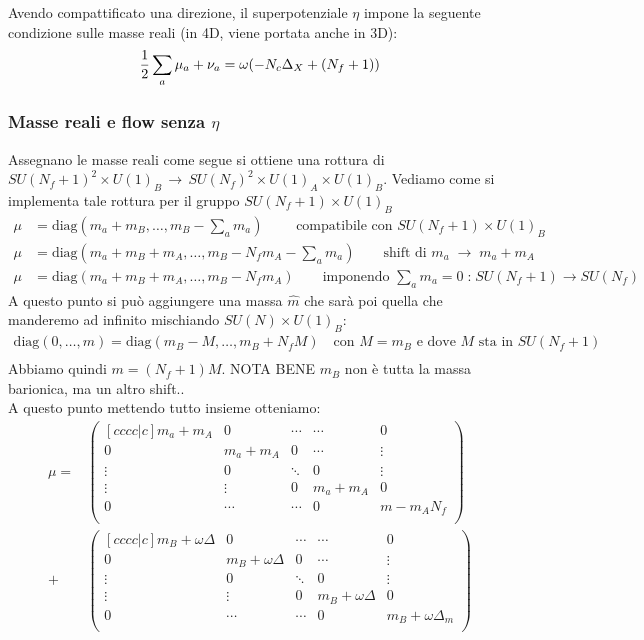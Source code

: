 \documentclass[a4paper,12pt]{article}
\begin{document}
Avendo compattificato una direzione, il superpotenziale $\eta$ impone la seguente condizione sulle masse reali (in 4D, viene portata anche in 3D):
\begin{equation}
  { 1 \over 2 } \sum_a \mu_a + \nu_a  = \omega ( - N_c \Delta_X + (N_f+1))
  \label{eqn:R-symm Anomaly}
\end{equation}
\subsubsection{Masse reali e flow senza $\eta$}

Assegnano le masse reali come segue si ottiene una rottura di $ SU(N_f+1)^2 \times U(1)_B \, \rightarrow \, SU(N_f)^2 \times U(1)_A \times U(1)_B$. Vediamo come si implementa tale rottura per il gruppo $SU(N_f+1) \times U(1)_B$
\begin{align*}
\mu &= \mbox{diag} ( m_a + m_B , \dots, m_B - \sum_a m_a) \qquad \mbox{ compatibile con } SU(N_f+1) \times U(1)_B \\
\mu &= \mbox{diag} ( m_a + m_B + m_A , \dots , m_B - N_f m_A - \sum_a m_a) \qquad \mbox{shift di } m_a \; \rightarrow \; m_a + m_A \\
\mu &= \mbox{diag} ( m_a + m_B + m_A , \dots , m_B - N_f m_A ) \qquad \mbox{imponendo } \sum_a m_a = 0 \;\mbox{:}\; SU(N_f+1) \rightarrow SU(N_f)
\end{align*}
A questo punto si può aggiungere una massa $\hat{m}$ che sarà poi quella che manderemo ad infinito mischiando $SU(N) \times U(1)_B$: 
\begin{align*}
\mbox{diag}(0, \dots , m ) = \mbox{diag} (m_B - M, \dots , m_B + N_f M) \quad \mbox{con } M = m_B \mbox{ e dove $M$ sta in } SU(N_f+1) \\
\end{align*}
Abbiamo quindi $ m = (N_f+1) M$. NOTA BENE $m_B$ non è tutta la massa barionica, ma un altro shift..\\
A questo punto mettendo tutto insieme otteniamo:
\begin{align*}
\mu = &
\begin{pmatrix}[c c c c|c]
		m_a + m_A 	& 0 		& \cdots 	& \cdots 	& 0 \\
		0 			 & m_a + m_A & 0 &\cdots & \vdots \\
		\vdots 		& 0 		& \ddots & 0 & \vdots \\
		\vdots & \vdots & 0 & m_a + m_A & 0 \\
		\hline 
		0 & \cdots & \cdots & 0 & m  - m_A N_f\\
\end{pmatrix} \\
+ &
\begin{pmatrix}[c c c c|c]
		m_B + \omega \Delta 	& 0 		& \cdots 	& \cdots 	& 0 \\
		0 			 & m_B + \omega \Delta & 0 &\cdots & \vdots \\
		\vdots 		& 0 		& \ddots & 0 & \vdots \\
		\vdots & \vdots & 0 & m_B + \omega \Delta & 0 \\
		\hline 
		0 & \cdots & \cdots & 0 &  m_B + \omega \Delta_m\\
\end{pmatrix}
\end{align*}
\end{document}
